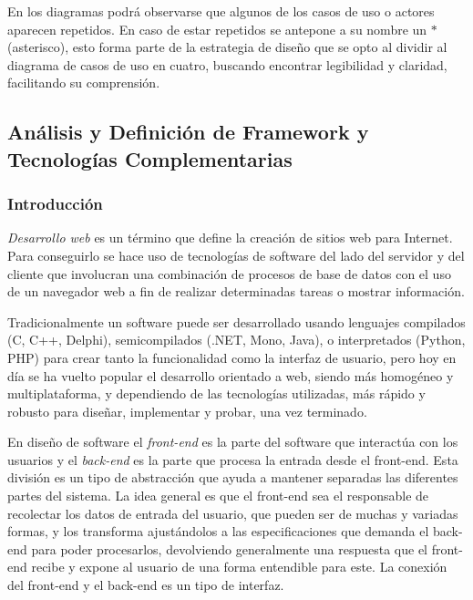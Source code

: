 \documentclass[11pt,oneside]{book}
\begin{document}
En los diagramas podrá observarse que algunos de los casos de uso o actores aparecen repetidos. En caso de estar repetidos se antepone a su nombre un \textbf{$*$} (asterisco), esto forma parte de la estrategia de diseño que se opto al dividir al diagrama de casos de uso en cuatro, buscando encontrar legibilidad y claridad, facilitando su comprensión.

\newpage
\subsection{Análisis y Definición de Framework y Tecnologías Complementarias}

\subsubsection{Introducción}
\textit{Desarrollo web} es un término que define la creación de sitios web para Internet. Para conseguirlo se hace uso de tecnologías de software del lado del servidor y del cliente que involucran una combinación de procesos de base de datos con el uso de un navegador web a fin de realizar determinadas tareas o mostrar información.

Tradicionalmente un software puede ser desarrollado usando lenguajes compilados (C, C++, Delphi), semicompilados (.NET, Mono, Java), o interpretados (Python, PHP) para crear tanto la funcionalidad como la interfaz de usuario, pero hoy en día se ha vuelto popular el desarrollo orientado a web, siendo más homogéneo y multiplataforma, y dependiendo de las tecnologías utilizadas, más rápido y robusto para diseñar, implementar y probar, una vez terminado.

En diseño de software el \textit{front-end} es la parte del software que interactúa con los usuarios y el \textit{back-end} es la parte que procesa la entrada desde el front-end. Esta división es un tipo de abstracción que ayuda a mantener separadas las diferentes partes del sistema. La idea general es que el front-end sea el responsable de recolectar los datos de entrada del usuario, que pueden ser de muchas y variadas formas, y los transforma ajustándolos a las especificaciones que demanda el back-end para poder procesarlos, devolviendo generalmente una respuesta que el front-end recibe y expone al usuario de una forma entendible para este. La conexión del front-end y el back-end es un tipo de interfaz.
\end{document}
